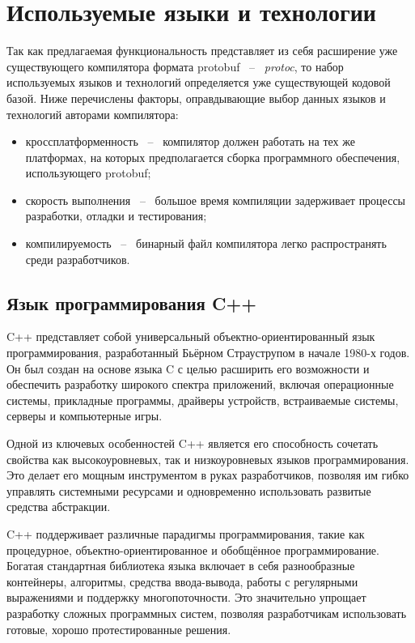 \section{Используемые языки и технологии}

Так как предлагаемая функциональность представляет из себя расширение уже существующего компилятора формата protobuf ~--~ \textit{protoc}, то набор
используемых языков и технологий определяется уже существующей кодовой базой. Ниже перечислены факторы, оправдывающие выбор данных языков и технологий авторами компилятора:
\begin{itemize}
    \item кроссплатформенность ~--~ компилятор должен работать на тех же платформах, на которых предполагается сборка программного обеспечения, использующего protobuf;
    \item скорость выполнения ~--~ большое время компиляции задерживает процессы разработки, отладки и тестирования;
    \item компилируемость ~--~ бинарный файл компилятора легко распространять среди разработчиков.
\end{itemize}

\subsection{Язык программирования C++}

C++ представляет собой универсальный объектно-ориентированный язык программирования, разработанный Бьёрном Страуструпом в начале 1980-х годов. Он был создан на основе языка C с целью расширить его возможности и обеспечить разработку широкого спектра приложений, включая операционные системы, прикладные программы, драйверы устройств, встраиваемые системы, серверы и компьютерные игры.

Одной из ключевых особенностей C++ является его способность сочетать свойства как высокоуровневых, так и низкоуровневых языков программирования. Это делает его мощным инструментом в руках разработчиков, позволяя им гибко управлять системными ресурсами и одновременно использовать развитые средства абстракции\cite{modern_and_effective_cpp}.

C++ поддерживает различные парадигмы программирования, такие как процедурное, объектно-ориентированное и обобщённое программирование. Богатая стандартная библиотека языка включает в себя разнообразные контейнеры, алгоритмы, средства ввода-вывода, работы с регулярными выражениями и поддержку многопоточности. Это значительно упрощает разработку сложных программных систем, позволяя разработчикам использовать готовые, хорошо протестированные решения.


